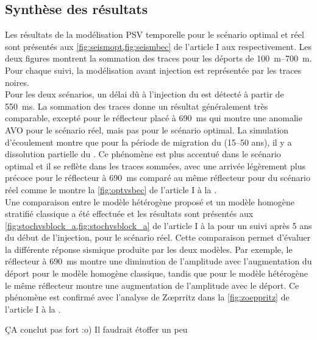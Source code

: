 \subsection{Synthèse des résultats}
Les résultats de la modélisation PSV temporelle pour le scénario optimal et réel sont présentés aux \cref{fig:seismopt,fig:seismbec} de l'article I aux  respectivement. Les deux figures montrent la sommation des traces pour les déports de \SIrange{100}{700}{\metre}. Pour chaque suivi, la modélisation avant injection est représentée par les traces noires.\\
Pour les deux scénarios, un délai dû à l'injection du  est détecté à partir de \SI{550}{\milli\second}. La sommation des traces donne un résultat généralement très comparable, excepté pour le réflecteur placé à \SI{690}{\milli\second} qui montre une anomalie AVO pour le scénario réel, mais pas pour le scénario optimal. La simulation d'écoulement montre que pour la période de migration du  (\numrange{15}{50} ans), il y a dissolution partielle du . Ce phénomène est plus accentué dans le scénario optimal et il se reflète dans les traces sommées, avec une arrivée légèrement plus précoce pour le réflecteur à \SI{690}{\milli\second} comparé au même réflecteur pour du scénario réel comme le montre la \cref{fig:optvsbec} de l'article I à la .\\
Une comparaison entre le modèle hétérogène proposé et un modèle homogène stratifié classique a été effectuée et les résultats sont présentés aux \cref{fig:stochvsblock_a,fig:stochvsblock_a} de l'article I à la  pour un suivi après \num{5} ans du début de l’injection, pour le scénario réel. Cette comparaison permet d’évaluer la différente réponse sismique produite par les deux modèles. Par exemple, le réflecteur à \SI{690}{\milli\second} montre une diminution de l'amplitude avec l'augmentation du déport pour le modèle homogène classique, tandis que pour le modèle hétérogène le même réflecteur montre une augmentation de l'amplitude avec le déport. Ce phénomène est confirmé avec l’analyse de Zœprritz \citep{Aki1980} dans la \cref{fig:zoeppritz} de l'article I à la .

ÇA conclut pas fort :o)  Il faudrait étoffer un peu